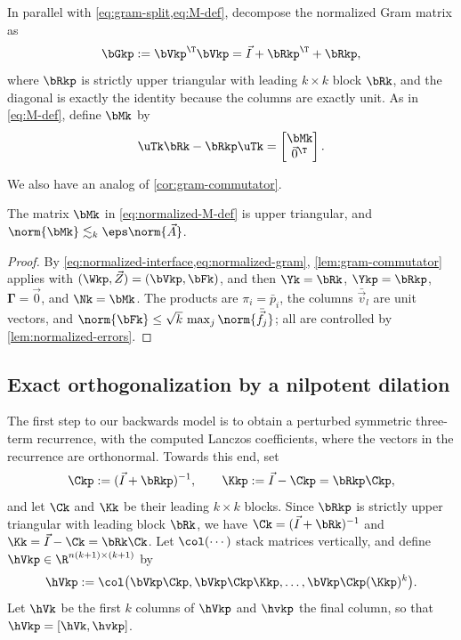 In parallel with \cref{eq:gram-split,eq:M-def}, decompose the normalized Gram matrix as
\begin{equation}
 \bGkp:=\bVkp^\T\bVkp=\vec I+\bRkp^\T+\bRkp,
 \label{eq:normalized-gram}
\end{equation}
where \(\bRkp\) is strictly upper triangular with leading \(k\times k\) block \(\bRk\), and the diagonal is exactly the identity because the columns are exactly unit.
As in \cref{eq:M-def}, define \(\bMk\) by
\begin{equation}
 \uTk\bRk-\bRkp\uTk
 =\begin{bmatrix}\bMk\\\vec 0^\T\end{bmatrix}.
 \label{eq:normalized-M-def}
\end{equation}

We also have an analog of \cref{cor:gram-commutator}.
\begin{corollary}
\label{cor:normalized-commutator}
The matrix \(\bMk\) in \cref{eq:normalized-M-def} is upper triangular, and \(\norm{\bMk}\lesssim_k\eps\norm{\vec A}\).
\end{corollary}

\begin{proof}
By \cref{eq:normalized-interface,eq:normalized-gram}, \cref{lem:gram-commutator} applies with \((\Wkp,\vec Z)=(\bVkp,\bFk)\), and then \(\Yk=\bRk\), \(\Ykp=\bRkp\), \(\bm\Gamma=\vec0\), and \(\Nk=\bMk\).
The products are \(\pi_i=\bar p_i\), the columns \(\bar{\vec v}_l\) are unit vectors, and \(\norm{\bFk}\le\sqrt{k}\,\max_j\norm{\bar{\vec f}_j}\); all are controlled by \cref{lem:normalized-errors}.
\end{proof}

\subsection{Exact orthogonalization by a nilpotent dilation}
\label{sec:dilation}

The first step to our backwards model is to obtain a perturbed symmetric three-term recurrence, with the computed Lanczos coefficients, where the vectors in the recurrence are orthonormal.
Towards this end, set
\begin{equation}
 \Ckp:=(\vec I+\bRkp)^{-1},
 \qquad
 \Kkp:=\vec I-\Ckp=\bRkp\Ckp,
 \label{eq:CKsy}
\end{equation}
and let \(\Ck\) and \(\Kk\) be their leading \(k\times k\) blocks.
Since \(\bRkp\) is strictly upper triangular with leading block \(\bRk\), we have \(\Ck=(\vec I+\bRk)^{-1}\) and \(\Kk=\vec I-\Ck=\bRk\Ck\).
Let $\col(\cdots)$ stack matrices vertically, and define \(\hVkp\in\R^{n(k+1)\times(k+1)}\) by
\begin{equation}
 \hVkp
 := \col\bigl( \bVkp\Ckp, \bVkp\Ckp\Kkp,
  \ldots, \bVkp\Ckp(\Kkp)^{k}\bigr).
 \label{eq:dilation-def}
\end{equation}
Let \(\hVk\) be the first \(k\) columns of \(\hVkp\) and \(\hvkp\) the final column, so that \(\hVkp=[\hVk,\hvkp]\).

